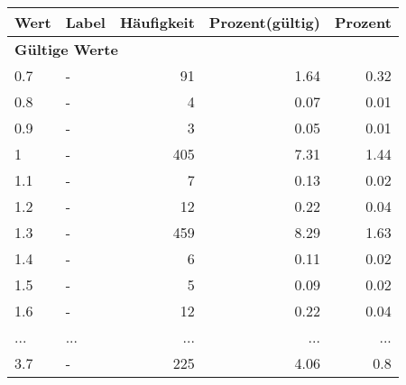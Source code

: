      \begin{longtable}{lXrrr}
     \toprule
     \textbf{Wert} & \textbf{Label} & \textbf{Häufigkeit} & \textbf{Prozent(gültig)} & \textbf{Prozent} \\
     \endhead
     \midrule
     \multicolumn{5}{l}{\textbf{Gültige Werte}}\\
        0.7 & \multicolumn{1}{X}{-} & %
          \num{91} &
          \num[round-mode=places,round-precision=2]{1,64} &
          \num[round-mode=places,round-precision=2]{0,32} \\
        0.8 & \multicolumn{1}{X}{-} & %
          \num{4} &
          \num[round-mode=places,round-precision=2]{0,07} &
          \num[round-mode=places,round-precision=2]{0,01} \\
        0.9 & \multicolumn{1}{X}{-} & %
          \num{3} &
          \num[round-mode=places,round-precision=2]{0,05} &
          \num[round-mode=places,round-precision=2]{0,01} \\
        1 & \multicolumn{1}{X}{-} & %
          \num{405} &
          \num[round-mode=places,round-precision=2]{7,31} &
          \num[round-mode=places,round-precision=2]{1,44} \\
        1.1 & \multicolumn{1}{X}{-} & %
          \num{7} &
          \num[round-mode=places,round-precision=2]{0,13} &
          \num[round-mode=places,round-precision=2]{0,02} \\
        1.2 & \multicolumn{1}{X}{-} & %
          \num{12} &
          \num[round-mode=places,round-precision=2]{0,22} &
          \num[round-mode=places,round-precision=2]{0,04} \\
        1.3 & \multicolumn{1}{X}{-} & %
          \num{459} &
          \num[round-mode=places,round-precision=2]{8,29} &
          \num[round-mode=places,round-precision=2]{1,63} \\
        1.4 & \multicolumn{1}{X}{-} & %
          \num{6} &
          \num[round-mode=places,round-precision=2]{0,11} &
          \num[round-mode=places,round-precision=2]{0,02} \\
        1.5 & \multicolumn{1}{X}{-} & %
          \num{5} &
          \num[round-mode=places,round-precision=2]{0,09} &
          \num[round-mode=places,round-precision=2]{0,02} \\
        1.6 & \multicolumn{1}{X}{-} & %
          \num{12} &
          \num[round-mode=places,round-precision=2]{0,22} &
          \num[round-mode=places,round-precision=2]{0,04} \\
       ... & ... & ... & ... & ... \\
        3.7 & \multicolumn{1}{X}{-} & %
          \num{225} &
          \num[round-mode=places,round-precision=2]{4,06} &
          \num[round-mode=places,round-precision=2]{0,8} \\


\end{longtable}

